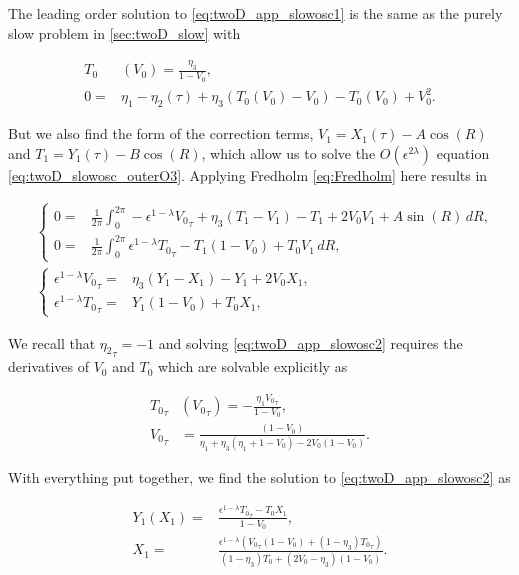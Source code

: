 The leading order solution to \eqref{eq:twoD_app_slowosc1} is the same as the purely slow problem in \autoref{sec:twoD_slow} with

\begin{equation*}
\begin{aligned}
T_0&(V_0)=\frac{\eta_3}{1-V_0},\\
0=& \eta_1-\eta_2(\tau)+\eta_3(T_0(V_0)-V_0)-T_0(V_0)+V_0^2.
\end{aligned}
\end{equation*}

But we also find the form of the correction terms, $V_1 = X_1(\tau) -A\cos(R)$ and $T_1 = Y_1(\tau)-B\cos(R)$, which allow us to solve the $O(\epsilon^{2\lambda})$ equation \eqref{eq:twoD_slowosc_outerO3}. Applying Fredholm \eqref{eq:Fredholm} here results in 

\begin{equation}\label{eq:twoD_app_slowosc2}
\begin{aligned}
&\begin{cases}
	0 = & \frac{1}{2\pi}\int_0^{2\pi}-\epsilon^{1-\lambda}{V_0}_\tau+\eta_3(T_1-V_1)-T_1+2V_0V_1+A\sin(R)\,dR,\\
	 0 =& \frac{1}{2\pi}\int_0^{2\pi} \epsilon^{1-\lambda}{T_0}_\tau-T_1(1-V_0)+T_0V_1\,dR,
\end{cases}\\
&\begin{cases}
	\epsilon^{1-\lambda}{V_0}_\tau=&\eta_3(Y_1-X_1)-Y_1+2V_0X_1, \\
	 \epsilon^{1-\lambda}{T_0}_\tau =&  Y_1(1-V_0)+T_0X_1,
\end{cases}
\end{aligned}
\end{equation}

We recall that ${\eta_2}_\tau=-1$ and solving \eqref{eq:twoD_app_slowosc2} requires the derivatives of $V_0$ and $T_0$ which are solvable explicitly as

\begin{equation*}
\begin{aligned}
{T_0}_\tau&({V_0}_\tau) = -\frac{\eta_1{V_0}_\tau}{1-V_0},\\
{V_0}_\tau &=\frac{(1-V_0)}{\eta_1+\eta_3(\eta_1+1-V_0)-2V_0(1-V_0)}. 
\end{aligned}
\end{equation*}

With everything put together, we find the solution to \eqref{eq:twoD_app_slowosc2} as 

\begin{equation*}
\begin{aligned}
Y_1(X_1) =& \frac{\epsilon^{1-\lambda}{T_0}_\tau-T_0X_1}{1-V_0},\\
X_1=&\frac{\epsilon^{1-\lambda}({V_0}_\tau(1-V_0)+(1-\eta_3){T_0}_\tau)}{(1-\eta_3)T_0+(2V_0-\eta_3)(1-V_0)}.
\end{aligned}
\end{equation*}


